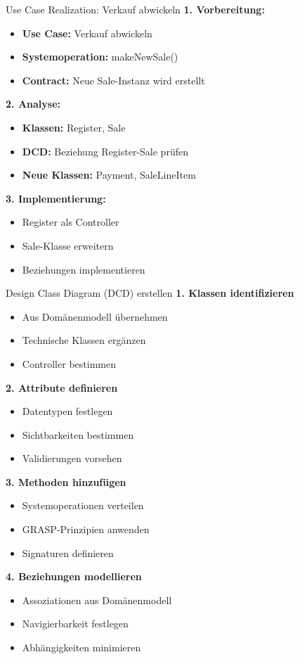 \begin{example2}{Use Case Realization: Verkauf abwickeln}
\textbf{1. Vorbereitung:}
\begin{itemize}
    \item \textbf{Use Case:} Verkauf abwickeln
    \item \textbf{Systemoperation:} makeNewSale()
    \item \textbf{Contract:} Neue Sale-Instanz wird erstellt
\end{itemize}

\textbf{2. Analyse:}
\begin{itemize}
    \item \textbf{Klassen:} Register, Sale
    \item \textbf{DCD:} Beziehung Register-Sale prüfen
    \item \textbf{Neue Klassen:} Payment, SaleLineItem
\end{itemize}

\textbf{3. Implementierung:}
\begin{itemize}
    \item Register als Controller
    \item Sale-Klasse erweitern
    \item Beziehungen implementieren
\end{itemize}
\end{example2}

\begin{KR}{Design Class Diagram (DCD) erstellen}
\textbf{1. Klassen identifizieren}
\begin{itemize}
    \item Aus Domänenmodell übernehmen
    \item Technische Klassen ergänzen
    \item Controller bestimmen
\end{itemize}

\textbf{2. Attribute definieren}
\begin{itemize}
    \item Datentypen festlegen
    \item Sichtbarkeiten bestimmen
    \item Validierungen vorsehen
\end{itemize}

\textbf{3. Methoden hinzufügen}
\begin{itemize}
    \item Systemoperationen verteilen
    \item GRASP-Prinzipien anwenden
    \item Signaturen definieren
\end{itemize}

\textbf{4. Beziehungen modellieren}
\begin{itemize}
    \item Assoziationen aus Domänenmodell
    \item Navigierbarkeit festlegen
    \item Abhängigkeiten minimieren
\end{itemize}
\end{KR}

